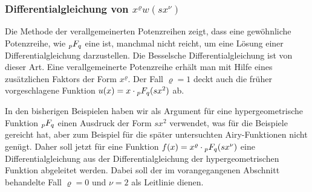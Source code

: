 %
%
%
\subsubsection{Differentialgleichung von $x^\varrho w(sx^\nu)$}
Die Methode der verallgemeinerten Potenzreihen zeigt, dass eine
gewöhnliche Potenzreihe, wie $\mathstrut_pF_q$ eine ist,
manchmal nicht reicht, um eine Lösung einer Differentialgleichung
darzustellen.
Die Besselsche Differentialgleichung ist von dieser Art.
Eine verallgemeinerte Potenzreihe erhält man mit Hilfe eines
zusätzlichen Faktors der Form $x^\varrho$.
Der Fall $\varrho=1$ deckt auch die früher vorgeschlagene
Funktion $u(x)=x\cdot \mathstrut_pF_q(sx^2)$ ab.

In den bisherigen Beispielen haben wir als Argument für eine
hypergeometrische Funktion $\mathstrut_pF_q$ einen Ausdruck
der Form $sx^2$ verwendet, was für die Beispiele gereicht hat,
aber zum Beispiel für die später untersuchten Airy-Funktionen
nicht genügt.
Daher soll jetzt für eine Funktion $f(x)
= x^\varrho\cdot \mathstrut_pF_q(sx^\nu)$ eine Differentialgleichung
aus der Differentialgleichung der hypergeometrischen Funktion
abgeleitet werden.
Dabei soll der im vorangegangenen Abschnitt behandelte Fall
$\varrho=0$ und $\nu=2$ als Leitlinie dienen.

